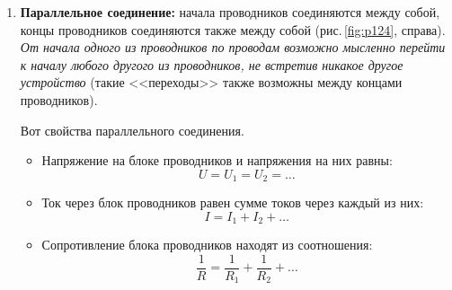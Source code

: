 \documentclass[main.tex]{subfiles}
\begin{document}
\begin{NoHyper}
\begin{enumerate}
    Вот свойства последовательного соединения.
    \begin{itemize}
        \item Сила тока (кратко~--- ток) через блок проводников\footnote{Блок проводников~--- это группа соединенных между собой проводников (блок имеет два вывода, или конца). Такой блок можно рассматривать как один сложный проводник.} и токи через проводники равны:
        \begin{equation}
            I=I_1=I_2=\ldots
        \end{equation}
        \item Напряжение между концами блока проводников равно сумме напряжений на каждом проводнике:
        \begin{equation}
            U=U_1+U_2+\ldots
        \end{equation}
        \item Сопротивление блока проводников находят так: 
        \begin{equation}
            R=R_1+R_2+\ldots
        \end{equation}
    \end{itemize}
    
    
    
    \item \textbf{Параллельное соединение:} начала проводников соединяются между собой, концы проводников соединяются также между собой (рис.\,\ref{fig:p124}, справа). \emph{От начала одного из проводников по проводам возможно мысленно перейти к началу любого другого из проводников, не встретив никакое другое устройство} (такие <<переходы>> также возможны между концами проводников).

    Вот свойства параллельного соединения.
    \begin{itemize}
        \item Напряжение на блоке проводников и напряжения на них равны:
        \begin{equation}
            U=U_1=U_2=\ldots
        \end{equation}
        \item Ток через блок проводников равен сумме токов через каждый из них:
        \begin{equation}
            I=I_1+I_2+\ldots
        \end{equation}
        \item Сопротивление блока проводников находят из соотношения: 
        \begin{equation}
            \dfrac{1}{R}=\dfrac{1}{R_1}+\dfrac{1}{R_2}+\ldots
        \end{equation}
    \end{itemize}
    

\end{enumerate}
\end{NoHyper}
\end{document}
